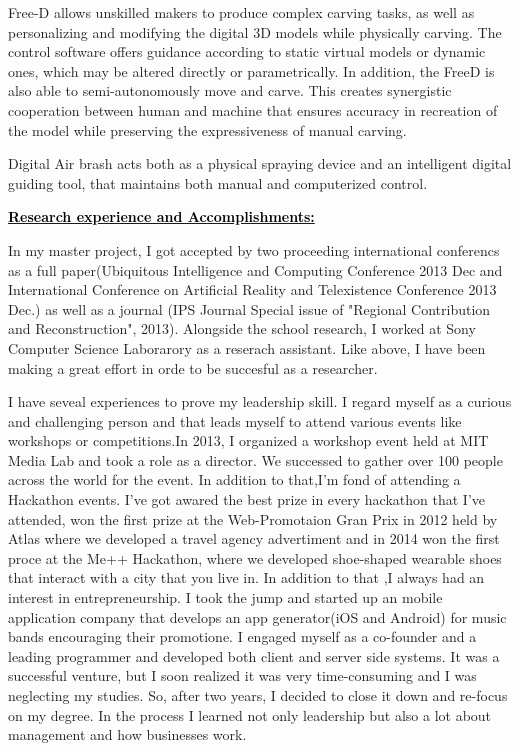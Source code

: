 \documentclass{article}
\newcommand{\statement}[1]{\par\medskip
  \underline{\textcolor{black}{\textbf{#1:}}}\space
}
\begin{document}
Free-D allows unskilled makers to produce complex carving tasks, as well as personalizing and modifying the digital 3D models while physically carving. The control software offers guidance according to static virtual models or dynamic ones, which may be altered directly or parametrically. In addition, the FreeD is also able to semi-autonomously move and carve. This creates synergistic cooperation between human and machine that ensures accuracy in recreation of the model while preserving the expressiveness of manual carving. 

Digital Air brash acts both as a physical spraying device and an intelligent digital guiding tool, that maintains both manual and computerized control.


\statement{Research experience and Accomplishments}
In my master project, I got accepted by two proceeding international conferencs as a full paper(Ubiquitous Intelligence and Computing Conference 2013 Dec and International Conference on Artificial Reality and Telexistence Conference 2013 Dec.) as well as a journal (IPS Journal Special issue of "Regional Contribution and Reconstruction", 2013). Alongside the school research, I worked at Sony Computer Science Laborarory as a reserach assistant. Like above, I have been making a great effort in orde to be succesful as a researcher. 

I have seveal experiences to prove my leadership skill. I regard myself as a curious and challenging person and that leads myself to attend various events like workshops or competitions.In 2013, I organized a workshop event held at MIT Media Lab and took a role as a director. We successed to gather over 100 people across the world for the event. In addition to that,I'm fond of attending a Hackathon events. I've got awared the best prize in every hackathon that I've attended, won the first prize at the Web-Promotaion Gran Prix in 2012 held by Atlas where we developed a travel agency advertiment and in 2014 won the first proce at the Me++ Hackathon, where we developed shoe-shaped wearable shoes that interact with a city that you live in. In addition to that ,I always had an interest in entrepreneurship. I took the jump and started up an mobile application company that develops an app generator(iOS and Android) for music bands encouraging their promotione. I engaged myself as a co-founder and a leading programmer and developed both client and server side systems. It was a successful venture, but I soon realized it was very time-consuming and I was neglecting my studies. So, after two years, I decided to close it down and re-focus on my degree. In the process I learned not only leadership but also a lot about management and how businesses work.
\end{document}
